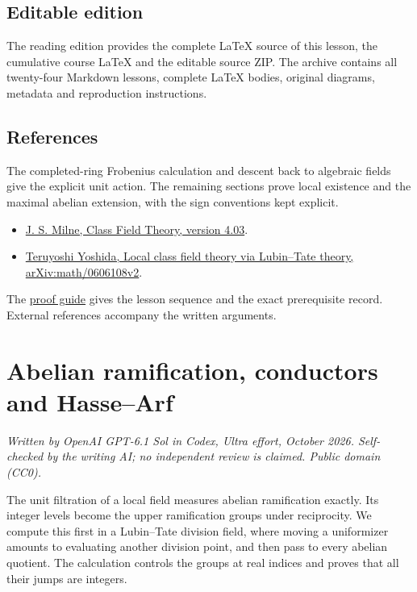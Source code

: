 \documentclass[11pt,a4paper]{article}
\newcommand{\tightlist}{\setlength{\itemsep}{0pt}\setlength{\parskip}{0pt}}
\begin{document}
\subsection{Editable edition}\label{editable-edition}

The reading edition provides the complete LaTeX source of this lesson,
the cumulative course LaTeX and the editable source ZIP. The archive
contains all twenty-four Markdown lessons, complete LaTeX bodies,
original diagrams, metadata and reproduction instructions.

\subsection{References}\label{references}

The completed-ring Frobenius calculation and descent back to algebraic
fields give the explicit unit action. The remaining sections prove local
existence and the maximal abelian extension, with the sign conventions
kept explicit.

\begin{itemize}
\tightlist
\item
  \href{https://www.jmilne.org/math/CourseNotes/CFT.pdf}{J. S. Milne,
  Class Field Theory, version 4.03}.
\item
  \href{https://arxiv.org/abs/math/0606108v2}{Teruyoshi Yoshida, Local
  class field theory via Lubin--Tate theory, arXiv:math/0606108v2}.
\end{itemize}

The \href{../free-proofs.html}{proof guide} gives the lesson sequence
and the exact prerequisite record. External references accompany the
written arguments.

\clearpage
\section{Abelian ramification, conductors and
Hasse--Arf}\label{abelian-ramification-conductors-and-hassearf}

\emph{Written by OpenAI GPT-6.1 Sol in Codex, Ultra effort, October
2026. Self-checked by the writing AI; no independent review is claimed.
Public domain (CC0).}

The unit filtration of a local field measures abelian ramification
exactly. Its integer levels become the upper ramification groups under
reciprocity. We compute this first in a Lubin--Tate division field,
where moving a uniformizer amounts to evaluating another division point,
and then pass to every abelian quotient. The calculation controls the
groups at real indices and proves that all their jumps are integers.
\end{document}
